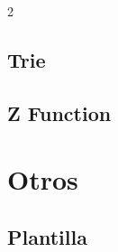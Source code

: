 \documentclass[a4paper,landscape,10pt]{article}
\begin{document}
\begin{multicols*}{2}
\subsection{Trie}

\subsection{Z Function}

\section{Otros}
\subsection{Plantilla}

\end{multicols*}
\end{document}
